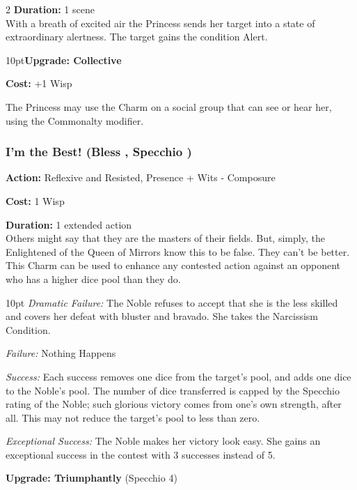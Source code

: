 \begin{multicols}{2}
\noindent \textbf{Duration:} 1 scene \\

\noindent With a breath of excited air the Princess sends her target into a state of extraordinary alertness. The target gains the condition Alert. 

\begin{myindentpar}{10pt}\textbf{Upgrade: Collective}

\noindent \textbf{Cost:} +1 Wisp

The Princess may use the Charm on a social group that can see or hear her, using the Commonalty modifier. 
\end{myindentpar}

 
\subsubsection*{I'm the Best! (Bless \textbullet, Specchio \textbullet)}

\noindent \textbf{Action:} Reflexive and Resisted, Presence + Wits - Composure 

\noindent \textbf{Cost:} 1 Wisp

\noindent \textbf{Duration:} 1 extended action\\

\noindent Others might say that they are the masters of their fields. But, simply, the Enlightened of the Queen of Mirrors know this to be false. They can’t be better. This Charm can be used to enhance any contested action against an opponent who has a higher dice pool than they do.

\begin{myindentpar}{10pt} \emph{Dramatic Failure:} The Noble refuses to accept that she is the less skilled and covers her defeat with bluster and bravado. She takes the Narcissism Condition.

\emph{Failure:} Nothing Happens 

\emph{Success:}  Each success removes one dice from the target’s pool, and adds one dice to the Noble’s pool. The number of dice transferred is capped by the Specchio rating of the Noble; such glorious victory comes from one’s own strength, after all. This may not reduce the target’s pool to less than zero.

\emph{Exceptional Success:}  The Noble makes her victory look easy. She gains an exceptional success in the contest with 3 successes instead of 5.

\textbf{Upgrade: Triumphantly} (Specchio 4)


\end{myindentpar}
\end{multicols}

